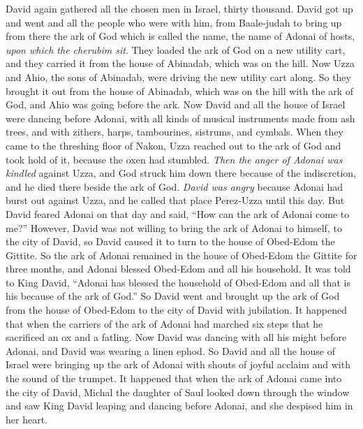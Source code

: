 \begin{biblechapter} %
 David again gathered all the chosen men in Israel, thirty thousand.
\verse David got up and went and all the people who were with him, from Baale-judah to bring up from there the ark of God which is called the name, the name of Adonai of hosts, \textit{upon which the cherubim sit}.
\verse They loaded the ark of God on a new utility cart, and they carried it from the house of Abinadab, which was on the hill. Now Uzza and Ahio, the sons of Abinadab, were driving the new utility cart along.
\verse So they brought it out from the house of Abinadab, which was on the hill with the ark of God, and Ahio was going before the ark.
\verse Now David and all the house of Israel were dancing before Adonai, with all kinds of musical instruments made from ash trees, and with zithers, harps, tambourines, sistrums, and cymbals.
\verse When they came to the threshing floor of Nakon, Uzza reached out to the ark of God and took hold of it, because the oxen had stumbled.
\verse \textit{Then the anger of Adonai was kindled} against Uzza, and God struck him down there because of the indiscretion, and he died there beside the ark of God.
\verse \textit{David was angry} because Adonai had burst out against Uzza, and he called that place Perez-Uzza until this day.
\verse But David feared Adonai on that day and said, “How can the ark of Adonai come to me?”
\verse However, David was not willing to bring the ark of Adonai to himself, to the city of David, so David caused it to turn to the house of Obed-Edom the Gittite.
\verse So the ark of Adonai remained in the house of Obed-Edom the Gittite for three months, and Adonai blessed Obed-Edom and all his household.
\verse It was told to King David, “Adonai has blessed the household of Obed-Edom and all that is his because of the ark of God.” So David went and brought up the ark of God from the house of Obed-Edom to the city of David with jubilation.
\verse It happened that when the carriers of the ark of Adonai had marched six steps that he sacrificed an ox and a fatling.
\verse Now David was dancing with all his might before Adonai, and David was wearing a linen ephod.
\verse So David and all the house of Israel were bringing up the ark of Adonai with shouts of joyful acclaim and with the sound of the trumpet.
\verse It happened that when the ark of Adonai came into the city of David, Michal the daughter of Saul looked down through the window and saw King David leaping and dancing before Adonai, and she despised him in her heart.

\end{biblechapter}
